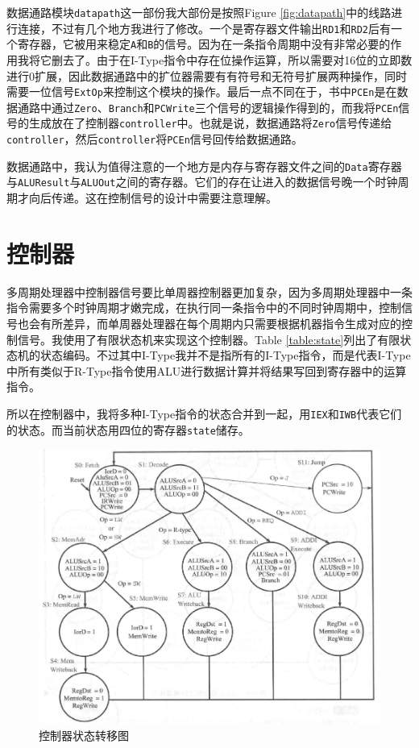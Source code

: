 \documentclass[12pt,a4paper]{article}
\newcommand{\incode}[1]{\texttt{#1}} %
\begin{document}
数据通路模块\incode{datapath}这一部份我大部份是按照Figure \ref{fig:datapath}中的线路进行连接，不过有几个地方我进行了修改。一个是寄存器文件输出\incode{RD1}和\incode{RD2}后有一个寄存器，它被用来稳定\incode{A}和\incode{B}的信号。因为在一条指令周期中没有非常必要的作用我将它删去了。由于在I-Type指令中存在位操作运算，所以需要对16位的立即数进行0扩展，因此数据通路中的扩位器需要有有符号和无符号扩展两种操作，同时需要一位信号\incode{ExtOp}来控制这个模块的操作。最后一点不同在于，书中\incode{PCEn}是在数据通路中通过\incode{Zero}、\incode{Branch}和\incode{PCWrite}三个信号的逻辑操作得到的，而我将\incode{PCEn}信号的生成放在了控制器\incode{controller}中。也就是说，数据通路将\incode{Zero}信号传递给\incode{controller}，然后\incode{controller}将\incode{PCEn}信号回传给数据通路。

数据通路中，我认为值得注意的一个地方是内存与寄存器文件之间的\incode{Data}寄存器与\incode{ALUResult}与\incode{ALUOut}之间的寄存器。它们的存在让进入的数据信号晚一个时钟周期才向后传递。这在控制信号的设计中需要注意理解。

\section{控制器}

多周期处理器中控制器信号要比单周器控制器更加复杂，因为多周期处理器中一条指令需要多个时钟周期才嫩完成，在执行同一条指令中的不同时钟周期中，控制信号也会有所差异，而单周器处理器在每个周期内只需要根据机器指令生成对应的控制信号。我使用了有限状态机来实现这个控制器。Table \ref{table:state}列出了有限状态机的状态编码。不过其中I-Type我并不是指所有的I-Type指令，而是代表I-Type中所有类似于R-Type指令使用ALU进行数据计算并将结果写回到寄存器中的运算指令。

所以在控制器中，我将多种I-Type指令的状态合并到一起，用\incode{IEX}和\incode{IWB}代表它们的状态。而当前状态用四位的寄存器\incode{state}储存。

\begin{figure}[h]
	\centering
	\includegraphics[width=\textwidth]{state}
	\caption{控制器状态转移图}
	\label{fig:state}
\end{figure}
\end{document}
